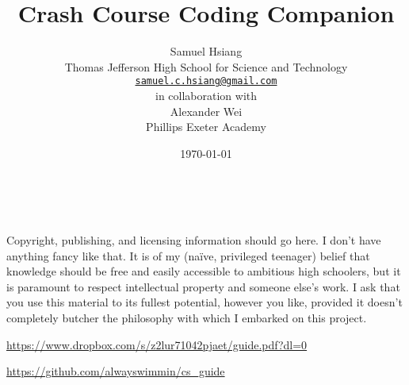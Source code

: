 \title{Crash Course Coding Companion}
\author{
Samuel Hsiang \\ 
Thomas Jefferson High School for Science and Technology \\ 
\href{mailto:samuel.c.hsiang@gmail.com}{\texttt{\textup{samuel.c.hsiang@gmail.com}}} \\
\vspace{.7em}
\textup{in collaboration with} \\
\vspace{.4em}
Alexander Wei \\
Phillips Exeter Academy
}
\date{\today}

\maketitle

\newpage
~\vfill
\thispagestyle{empty}


\noindent Copyright, publishing, and licensing information should go here. I don't have anything fancy like that. It is of my (na\"{i}ve, privileged teenager) belief that knowledge should be free and easily accessible to ambitious high schoolers, but it is paramount to respect intellectual property and someone else's work. I ask that you use this material to its fullest potential, however you like, provided it doesn't completely butcher the philosophy with which I embarked on this project.



\noindent \url{https://www.dropbox.com/s/z2lur71042pjaet/guide.pdf?dl=0}

\noindent \url{https://github.com/alwayswimmin/cs_guide}



\newpage
\thispagestyle{empty}
\par\vspace*{.35\textheight}{\centering For Rachel \par}

